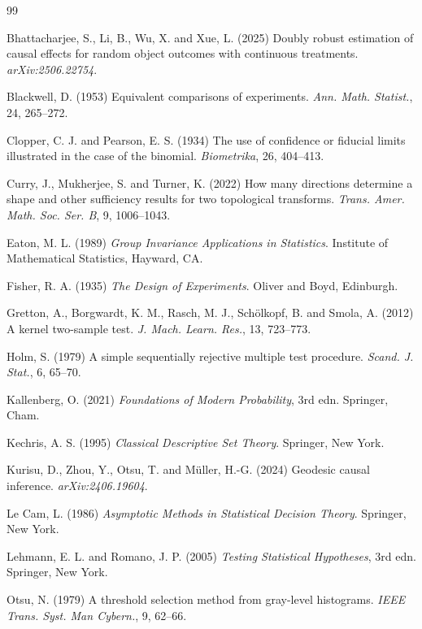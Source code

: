 \documentclass[11pt]{article}
\theoremstyle{plain}
\theoremstyle{definition}
\numberwithin{equation}{section}
\newcommand{\1}{\mathbf 1}
\begin{document}
\begin{thebibliography}{99}

Bhattacharjee, S., Li, B., Wu, X. and Xue, L. (2025) Doubly robust estimation of causal effects for random object outcomes with continuous treatments. \emph{arXiv:2506.22754}.

Blackwell, D. (1953) Equivalent comparisons of experiments. \emph{Ann. Math. Statist.}, 24, 265--272.

Clopper, C. J. and Pearson, E. S. (1934) The use of confidence or fiducial limits illustrated in the case of the binomial. \emph{Biometrika}, 26, 404--413.

Curry, J., Mukherjee, S. and Turner, K. (2022) How many directions determine a shape and other sufficiency results for two topological transforms. \emph{Trans. Amer. Math. Soc. Ser. B}, 9, 1006--1043.

Eaton, M. L. (1989) \emph{Group Invariance Applications in Statistics}. Institute of Mathematical Statistics, Hayward, CA.

Fisher, R. A. (1935) \emph{The Design of Experiments}. Oliver and Boyd, Edinburgh.

Gretton, A., Borgwardt, K. M., Rasch, M. J., Sch\"olkopf, B. and Smola, A. (2012) A kernel two-sample test. \emph{J. Mach. Learn. Res.}, 13, 723--773.

Holm, S. (1979) A simple sequentially rejective multiple test procedure. \emph{Scand. J. Stat.}, 6, 65--70.

Kallenberg, O. (2021) \emph{Foundations of Modern Probability}, 3rd edn. Springer, Cham.

Kechris, A. S. (1995) \emph{Classical Descriptive Set Theory}. Springer, New York.

Kurisu, D., Zhou, Y., Otsu, T. and M\"uller, H.-G. (2024) Geodesic causal inference. \emph{arXiv:2406.19604}.

Le Cam, L. (1986) \emph{Asymptotic Methods in Statistical Decision Theory}. Springer, New York.

Lehmann, E. L. and Romano, J. P. (2005) \emph{Testing Statistical Hypotheses}, 3rd edn. Springer, New York.

Otsu, N. (1979) A threshold selection method from gray-level histograms. \emph{IEEE Trans. Syst. Man Cybern.}, 9, 62--66.


\end{thebibliography}
\end{document}
